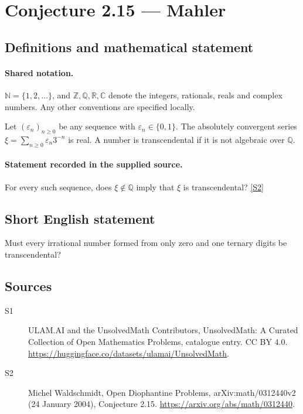 \documentclass[11pt]{article}
\newcommand{\sref}[2]{\hyperlink{source:#1:#2}{[S#2]}}
\begin{document}
\section{Conjecture 2.15 — Mahler}\label{statement}

\subsection{Definitions and mathematical statement}

\paragraph{Shared notation.}$\mathbb N=\{1,2,\ldots\}$, and $\mathbb Z,\mathbb Q,\mathbb R,\mathbb C$ denote the integers, rationals, reals and complex numbers. Any other conventions are specified locally.


Let $(\varepsilon_n)_{n\ge0}$ be any sequence with $\varepsilon_n\in\{0,1\}$. The absolutely convergent series $\xi=\sum_{n\ge0}\varepsilon_n3^{-n}$ is real. A number is transcendental if it is not algebraic over $\mathbb Q$.
\paragraph{Statement recorded in the supplied source.}
For every such sequence, does $\xi\notin\mathbb Q$ imply that $\xi$ is transcendental? \sref{statement}{2}
\subsection{Short English statement}
Must every irrational number formed from only zero and one ternary digits be transcendental?
\subsection{Sources}
\begin{description}
\item[\hypertarget{source:statement:1}{S1}] ULAM.AI and the UnsolvedMath Contributors, UnsolvedMath: A Curated Collection of Open Mathematics Problems, catalogue entry. CC BY 4.0. \url{https://huggingface.co/datasets/ulamai/UnsolvedMath}.
\item[\hypertarget{source:statement:2}{S2}] Michel Waldschmidt, Open Diophantine Problems, arXiv:math/0312440v2 (24 January 2004), Conjecture 2.15. \url{https://arxiv.org/abs/math/0312440}.
\end{description}
\label{end:statement}
\end{document}
